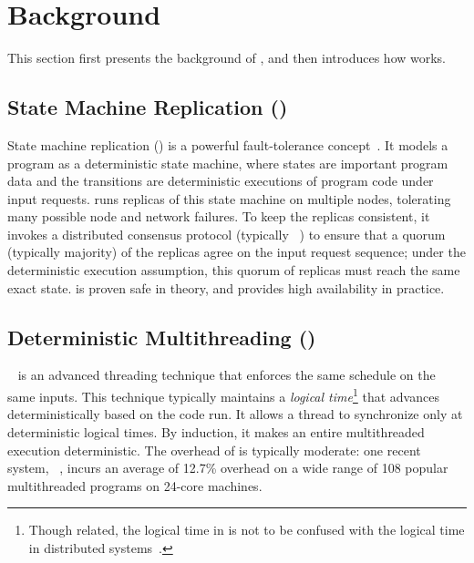 \section{Background} \label{sec:background}

This section first presents the background of \smr, and then introduces how 
\dmt works.

\subsection{State Machine Replication (\smr)} \label{sec:smr}

State machine replication (\smr) is a powerful fault-tolerance
concept~\cite{paxos:practical}.  It models a program as a deterministic state 
machine, where states are important program data and the transitions are 
deterministic executions of program code under input requests.  \smr runs 
replicas of this state machine on multiple nodes, tolerating many possible node 
and network failures.  To keep the replicas consistent, it invokes a
distributed consensus protocol (typically \paxos~\cite{paxos, paxos:simple, 
paxos:practical}) to ensure that a quorum (typically majority) of the replicas 
agree on the input request sequence; under the deterministic execution 
assumption, this quorum of replicas must reach the same exact state.  \smr is 
proven safe in theory, and provides high availability in practice.

\subsection{Deterministic Multithreading (\dmt)} \label{sec:dmt}

\dmt~\cite{dpj:oopsla09, 
dmp:asplos09, kendo:asplos09, coredet:asplos10, dos:osdi10, ddos:asplos13, 
ics:oopsla13} is an advanced threading technique that enforces the same 
schedule 
on the same inputs.  This technique typically maintains a \emph{logical
  time}\footnote{Though related, the logical time in \dmt is not to be
  confused with the logical time in distributed
  systems~\cite{lamportclock}.} that advances deterministically based on
the code run.  It allows a thread to synchronize only at deterministic
logical times.  By induction, it makes an entire multithreaded execution
deterministic.  The overhead of \dmt is typically moderate: one recent
\dmt system, \parrot~\cite{parrot:sosp13}, incurs an average of 12.7\%
overhead on a wide range of 108 popular multithreaded programs on 24-core
machines.

